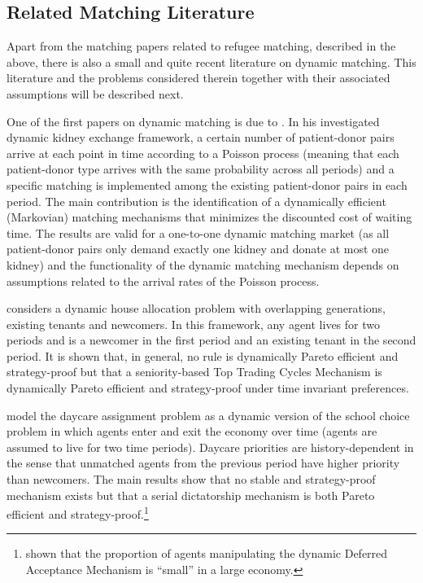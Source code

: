 \documentclass[12pt,fleqn]{article}
\begin{document}
\subsection{Related Matching Literature}\label{SEC:literature}
Apart from the matching papers related to refugee matching, described in the above, there is also a small and quite recent literature on dynamic matching. This literature and the problems considered therein together with their associated assumptions will be described next.

One of the first papers on dynamic matching is due to \citet{bib:Unver}. In his investigated dynamic kidney exchange framework, a certain number of patient-donor pairs arrive at each point in time according to a Poisson process (meaning that each patient-donor type arrives with the same probability across all periods) and a specific matching is implemented among the existing patient-donor pairs in each period. The main contribution is the identification of a dynamically efficient (Markovian) matching mechanisms that minimizes the discounted cost of waiting time. The results are valid for a one-to-one dynamic matching market (as all patient-donor pairs only demand exactly one kidney and donate at most one kidney) and the functionality of the dynamic matching mechanism depends on assumptions related to the arrival rates of the Poisson process.

\citet{bib:Kurino} considers a dynamic house allocation problem with overlapping generations, existing tenants and newcomers. In this framework, any agent lives for two periods and is a newcomer in the first period and an existing tenant in the second period. It is shown that, in general, no rule is dynamically Pareto efficient and strategy-proof but that a seniority-based Top Trading Cycles Mechanism is dynamically Pareto efficient and strategy-proof under time invariant preferences.

\citet{bib:KennesEtAl2014} model the daycare assignment problem as a dynamic version of the school choice problem in which agents enter and exit the economy over time (agents are assumed to live for two time periods). Daycare priorities are history-dependent in the sense that unmatched agents from the previous period have higher priority than newcomers. The main results show that no stable and strategy-proof mechanism exists but that a serial dictatorship mechanism is both Pareto efficient and strategy-proof.\footnote{\citet{bib:KennesEtAl2015} shown that the proportion of agents manipulating the dynamic Deferred Acceptance Mechanism is ``small'' in a large economy.}
\end{document}
